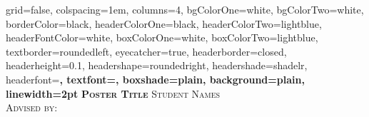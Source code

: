 \documentclass[landscape,final,a0paper,fontscale=0.29]{baposter}
\begin{document}
\begin{poster}%
  {
  grid=false,
  colspacing=1em,
  columns=4,
  bgColorOne=white,
  bgColorTwo=white,
  borderColor=black,
  headerColorOne=black,
  headerColorTwo=lightblue,
  headerFontColor=white,
  boxColorOne=white,
  boxColorTwo=lightblue,
  textborder=roundedleft,
  eyecatcher=true,
  headerborder=closed,
  headerheight=0.1\textheight,
  headershape=roundedright,
  headershade=shadelr,
  headerfont=\Large\bf\textsc, %
  textfont={\setlength{\parindent}{1.5em}},
  boxshade=plain,
  background=plain,
  linewidth=2pt
  }
  {\bf\textsc{Poster Title}\vspace{0.5em}}
  {\textsc{ Student Names\\ Advised by:}}
  {%

\setlength{\fboxsep}{0pt}%
\setlength{\fboxrule}{3pt}%
  }

    \newcommand{\colouredcircle}{%
      \tikz{\useasboundingbox (-0.2em,-0.32em) rectangle(0.2em,0.32em); \draw[draw=black,fill=lightblue,line width=0.03em] (0,0) circle(0.18em);}}




\end{poster}
\end{document}
